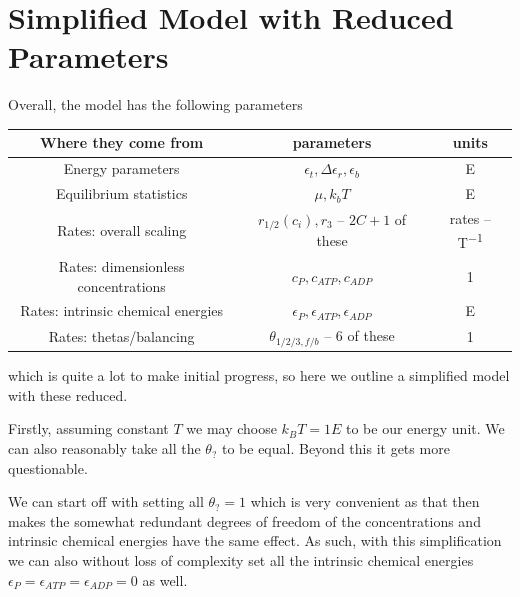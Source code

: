 \documentclass[11pt]{article}
\begin{document}
\section{Simplified Model with Reduced Parameters}\label{sec:simpar}
Overall, the model has the following parameters
\begin{table}[H]
    \centering
    \begin{tabular}{c|c|c}
        Where they come from & parameters & units \\
        \hline
        Energy parameters & $\epsilon_t, \Delta\epsilon_r, \epsilon_b$ & \si{E} \\
        Equilibrium statistics & $\mu, \si{k_b}T$ & \si{E} \\
        Rates: overall scaling & $r_{1/2}(c_i),r_3$ -- $2C+1$ of these & rates -- \si{T^{-1}} \\
        Rates: dimensionless concentrations & $c_P,c_{ATP},c_{ADP}$ & \si{1} \\
        Rates: intrinsic chemical energies & $\epsilon_P,\epsilon_{ATP},\epsilon_{ADP}$ & \si{E} \\
        Rates: thetas/balancing & $\theta_{1/2/3,f/b}$ -- 6 of these & \si{1} \\
    \end{tabular}
\end{table}
which is quite a lot to make initial progress, so here we outline a simplified model with these reduced.

Firstly, assuming constant $T$ we may choose $\si{k_B}T = 1\si{E}$ to be our energy unit.
We can also reasonably take all the $\theta_?$ to be equal.
Beyond this it gets more questionable.

\begin{tcolorbox}
    We can start off with setting all $\theta_? = 1$ which is very convenient as that then makes the somewhat redundant degrees of freedom of the concentrations and intrinsic chemical energies have the same effect.
    As such, with this simplification we can also without loss of complexity set all the intrinsic chemical energies $\epsilon_P=\epsilon_{ATP}=\epsilon_{ADP}=0$ as well.
\end{tcolorbox}
\end{document}
